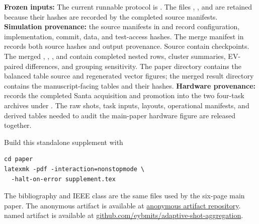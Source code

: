\documentclass[10pt,conference]{IEEEtran}
\begin{document}
\noindent\textbf{Frozen inputs:}
The current runnable protocol is . The files
,
,
and  are retained
because their hashes are recorded by the completed source manifests.
\textbf{Simulation provenance:}
the source manifests in  and
 record configuration,
implementation, commit, data, and test-access hashes. The merge manifest in
 records both source
hashes and output provenance. Source  contain checkpoints. The
merged ,
, , and
 contain completed nested rows, cluster
summaries, EV-paired differences, and grouping sensitivity.
The paper directory contains the balanced table source and regenerated vector
figures; the merged result directory contains the manuscript-facing tables and
their hashes.
\textbf{Hardware provenance:}
 records the
completed Santa acquisition and promotion into the two four-task archives under
. The raw shots, task inputs, layouts, operational
manifests, and derived tables needed to audit the main-paper hardware figure
are released together.

Build this standalone supplement with
\begin{scriptsize}
\begin{verbatim}
cd paper
latexmk -pdf -interaction=nonstopmode \
  -halt-on-error supplement.tex
\end{verbatim}
\end{scriptsize}
The bibliography and IEEE class are the same files used by the six-page main
paper.  The
\ifdefined\ANON
anonymous artifact is available at
\href{https://anonymous.4open.science/r/split-ensemble-qrc-E688/README.md}{anonymous artifact repository}.
\else
named artifact is available at
\href{https://github.com/eybmits/adaptive-shot-aggregation}{github.com/eybmits/adaptive-shot-aggregation}.
\fi



\end{document}
